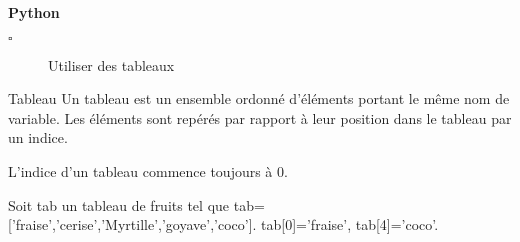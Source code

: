 \begin{titre}[Programmation]

\end{titre}


\begin{CpsCol}
\textbf{Python}
\begin{description}
\item[$\square$] Utiliser des tableaux
\end{description}
\end{CpsCol}


\begin{PC}

\end{PC}

\begin{DefT}{Tableau}
Un tableau est un ensemble ordonné d'éléments portant le même nom de variable. Les éléments sont repérés par rapport à leur position dans le tableau par un indice.

L'indice d'un tableau commence toujours à 0.
\end{DefT}


\begin{Ex}
Soit tab un tableau de fruits tel que tab=['fraise','cerise','Myrtille','goyave','coco']. tab[0]='fraise', tab[4]='coco'.
\end{Ex}


